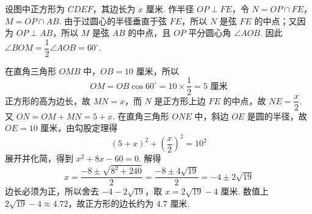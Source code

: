 \begin{solution}
设图中正方形为 \(CDEF\)，其边长为 \(x\text{ 厘米}\). 作半径 \(OP\perp FE\)，令 \(N=OP\cap FE\)，\(M=OP\cap AB\). 由于过圆心的半径垂直于弦 \(FE\)，所以 \(N\) 是弦 \(FE\) 的中点；又因为 \(OP\perp AB\)，所以 \(M\) 是弦 \(AB\) 的中点，且 \(OP\) 平分圆心角 \(\angle AOB\). 因此 \(\angle BOM=\dfrac12\angle AOB=60^\circ\).

在直角三角形 \(OMB\) 中，\(OB=10\text{ 厘米}\)，所以
\[
OM=OB\cos60^\circ=10\times\dfrac12=5\text{ 厘米}
\]
正方形的高为边长，故 \(MN=x\)，而 \(N\) 是正方形上边 \(FE\) 的中点，故 \(NE=\dfrac{x}{2}\). 又 \(ON=OM+MN=5+x\). 在直角三角形 \(ONE\) 中，斜边 \(OE\) 是圆的半径，故 \(OE=10\text{ 厘米}\)，由勾股定理得
\[
(5+x)^2+\left(\dfrac{x}{2}\right)^2=10^2
\]
展开并化简，得到 \(x^2+8x-60=0\). 解得
\[
x=\dfrac{-8\pm\sqrt{8^2+240}}{2}=\dfrac{-8\pm4\sqrt{19}}{2}=-4\pm2\sqrt{19}
\]
边长必须为正，所以舍去 \(-4-2\sqrt{19}\)，取 \(x=2\sqrt{19}-4\text{ 厘米}\). 数值上 \(2\sqrt{19}-4\approx4.72\)，故正方形的边长约为 \(4.7\text{ 厘米}\).
\end{solution}
